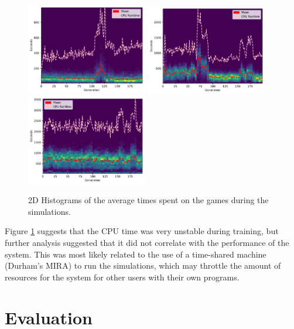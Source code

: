 \documentclass[12pt,a4paper]{article}
\begin{document}
            \begin{figure}[!ht]
                \centering
                \includegraphics[width=53mm]{images/results/1ply/simulation_timings.pdf}
                \includegraphics[width=53mm]{images/results/3ply/simulation_timings.pdf}
                \includegraphics[width=53mm]{images/results/6ply/simulation_timings.pdf}
                \caption{2D Histograms of the average times spent on the games during the simulations. \label{chart_cpu_times}}
            \end{figure}

            Figure \ref{chart_cpu_times} suggests that the CPU time was very unstable during training, but further analysis suggested that it did not correlate with the performance of the system. This was most likely related to the use of a time-shared machine (Durham's MIRA) to run the simulations, which may throttle the amount of resources for the system for other users with their own programs. %

\section{Evaluation}
 
\end{document}

